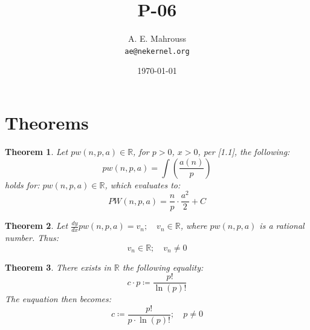 \documentclass[11pt, a4paper]{article}
\title{P-06}
\author{A. E. Mahrouss\\\texttt{ae@nekernel.org}}
\date{\today}
\theoremstyle{plain}
\newtheorem{theorem}{Theorem}[section]
\theoremstyle{definition}
\theoremstyle{remark}
\begin{document}
\twocolumn[{%
  \maketitle
  \vspace{-0.5em}
  \vspace{0.8em}
  \rule{\linewidth}{0.4pt}
  \vspace{1em}
}]

\maketitle

\section{Theorems}

\begin{theorem}
  Let $pw(n, p, a) \in \mathbb{R}$, for $p > 0$, $x > 0$, per [1.1], the following:
  \begin{equation}
    pw(n, p, a) = \int (\frac{a(n)}{p})
  \end{equation}
  holds for: $pw(n, p, a) \in \mathbb{R}$, which evaluates to:
  \begin{equation}
    PW(n, p, a) = \frac{n}{p}\cdot \frac{a^2}{2}+C
  \end{equation}
\end{theorem}

\begin{theorem}
  Let $\frac{dy}{dx}pw(n, p, a) = v_{n}; \quad v_{n} \in \mathbb{R}$, where $ pw(n, p, a) $ is a rational number. Thus:
  \begin{equation}
    v_{n} \in \mathbb{R}; \quad v_{n}\neq 0
  \end{equation}
\end{theorem}

\begin{theorem}
  There exists  in $\mathbb{R}$ the following equality:
  \begin{equation}
    c \cdot p \coloneq \frac{p!}{\ln \left(p\right)!}
  \end{equation}
  The euquation then becomes:
  \begin{equation}
    c \coloneq \frac{p!}{p \cdot \ln \left(p\right)!}; \quad p \neq 0
  \end{equation}
\end{theorem}
\end{document}
